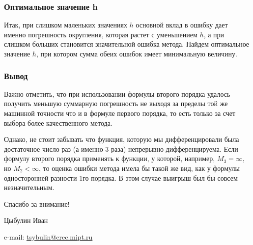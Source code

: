 \documentclass[aspectratio=43,unicode]{beamer}
\newcommand{\colorhref}[2]{\href{#1}{\textcolor{miptbase!30!black}{#2}}}
\begin{document}
\begin{frame}
\frametitle{Оптимальное значение h}
	Итак, при слишком маленьких значениях $h$ основной вклад в ошибку дает именно погрешность округления, которая
	растет с уменьшением $h$, а при слишком больших становится значительной ошибка метода. Найдем оптимальное значение
	$h$, при котором сумма обеих ошибок имеет минимальную величину.
	\pause

\end{frame}

\begin{frame}
\frametitle{Вывод}
	Важно отметить, что при использовании формулы второго порядка удалось получить меньшую суммарную погрешность
	не выходя за пределы той же машинной точности что и в формуле первого порядка, то есть только за счет выбора
	более качественного метода.
	\pause

	Однако, не стоит забывать что функция, которую мы дифференцировали была достаточное
	число раз (а именно 3 раза) непрерывно дифференцируема. Если формулу второго порядка применять
	к функции, у которой, например, $M_3 = \infty$, но $M_2 < \infty$, то оценка ошибки метода имела бы
	такой же вид, как у формулы односторонней разности 1го порядка. В этом случае выигрыш был бы совсем
	незначительным.
\end{frame}

\begin{frame}[plain]
  \begin{center}
  {\Huge Спасибо за внимание!}
  \vspace{8ex}

  Цыбулин Иван

  e-mail: \colorhref{mailto:tsybulin@crec.mipt.ru}{tsybulin@crec.mipt.ru}
  \end{center}
\end{frame}
\end{document}
